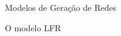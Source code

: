 \begin{section}{Modelos de Geração de Redes}
\begin{subsection}{O modelo LFR}
	

\end{subsection}

\end{section}


